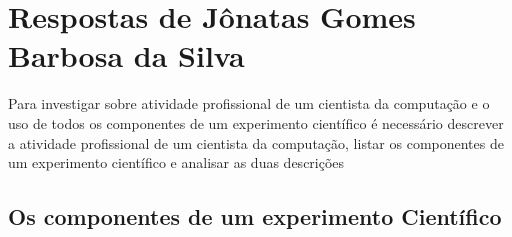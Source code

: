 \section{Respostas de Jônatas Gomes Barbosa da Silva}
Para investigar sobre atividade profissional de um cientista da computação e o uso de todos os componentes de um experimento científico é necessário descrever a atividade profissional de um cientista da computação, listar os componentes de um experimento científico e analisar as duas descrições

\subsection{Os componentes de um experimento Científico}
